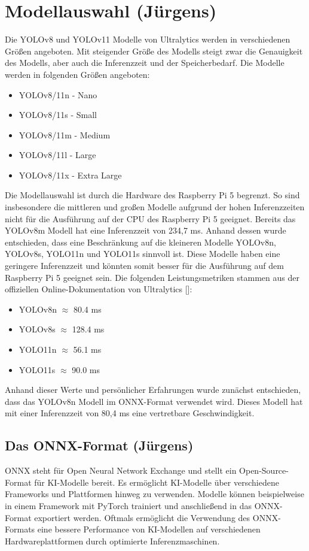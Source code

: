 \section{Modellauswahl (Jürgens)}
Die YOLOv8 und YOLOv11 Modelle von Ultralytics werden in verschiedenen Größen angeboten. Mit steigender Größe des Modells steigt zwar die Genauigkeit des Modells, aber auch die Inferenzzeit und der Speicherbedarf.
Die Modelle werden in folgenden Größen angeboten:
\begin{itemize}
    \item YOLOv8/11n - Nano 
    \item YOLOv8/11s - Small
    \item YOLOv8/11m - Medium
    \item YOLOv8/11l - Large
    \item YOLOv8/11x - Extra Large
\end{itemize}
Die Modellauswahl ist durch die Hardware des Raspberry Pi 5 begrenzt. So sind insbesondere die mittleren und großen Modelle aufgrund der hohen Inferenzzeiten nicht für die Ausführung auf der CPU des Raspberry Pi 5 geeignet. Bereits das YOLOv8m Modell hat eine Inferenzzeit von 234,7 ms. \cite{ultralyticsYOLOv8Performance} Anhand dessen wurde entschieden, dass eine Beschränkung auf die kleineren Modelle YOLOv8n, YOLOv8s, YOLO11n und YOLO11s sinnvoll ist. Diese Modelle haben eine geringere Inferenzzeit und könnten somit besser für die Ausführung auf dem Raspberry Pi 5 geeignet sein. 
Die folgenden Leistungsmetriken stammen aus der offiziellen Online-Dokumentation von Ultralytics [\cite{yolov8_ultralytics,ultralyticsYOLOv8Performance,yolo11_ultralytics}]:
\begin{itemize}
    \item YOLOv8n $\approx$ 80.4 ms
    \item YOLOv8s $\approx$ 128.4 ms
    \item YOLO11n $\approx$ 56.1 ms 
    \item YOLO11s $\approx$ 90.0 ms 
\end{itemize}

Anhand dieser Werte und persönlicher Erfahrungen wurde zunächst entschieden, dass das YOLOv8n Modell im ONNX-Format verwendet wird. Dieses Modell hat mit einer Inferenzzeit von 80,4 ms eine vertretbare Geschwindigkeit.

\subsection{Das ONNX-Format (Jürgens)}
ONNX steht für Open Neural Network Exchange und stellt ein Open-Source-Format für KI-Modelle bereit. Es ermöglicht KI-Modelle über verschiedene Frameworks und Plattformen hinweg zu verwenden. Modelle können beispielweise in einem Framework mit PyTorch trainiert und anschließend in das ONNX-Format exportiert werden. Oftmals ermöglicht die Verwendung des ONNX-Formats eine bessere Performance von KI-Modellen auf verschiedenen Hardwareplattformen durch optimierte Inferenzmaschinen. \cite{ultralyticsGlossaryONNX}

